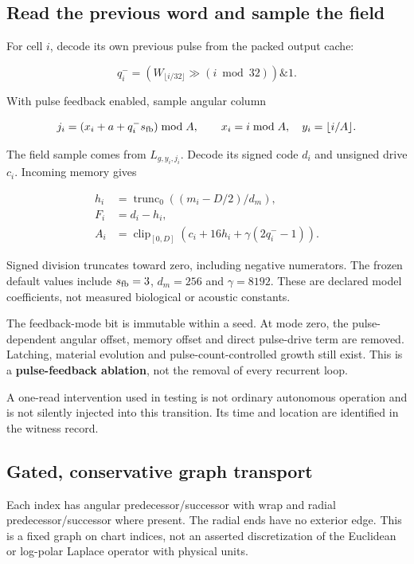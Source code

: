 \documentclass[11pt,a4paper]{article}
\begin{document}
\subsection{Read the previous word and sample the
field}\label{read-the-previous-word-and-sample-the-field}

For cell \(i\), decode its own previous pulse from the packed output
cache:

\[
q_i^-=
\left(W_{\lfloor i/32\rfloor}\gg(i\bmod32)\right)\mathbin{\&}1.
\]

With pulse feedback enabled, sample angular column

\[
j_i=(x_i+a+q_i^-s_{\rm fb})\bmod A,
\qquad x_i=i\bmod A,\quad y_i=\lfloor i/A\rfloor.
\]

The field sample comes from \(L_{g,y_i,j_i}\). Decode its signed code
\(d_i\) and unsigned drive \(c_i\). Incoming memory gives

\[
\begin{aligned}
h_i&=\operatorname{trunc}_0((m_i-D/2)/d_m),\\
F_i&=d_i-h_i,\\
A_i&=\operatorname{clip}_{[0,D]}
 \left(c_i+16h_i+\gamma(2q_i^--1)\right).
\end{aligned}
\]

Signed division truncates toward zero, including negative numerators.
The frozen default values include \(s_{\rm fb}=3\), \(d_m=256\) and
\(\gamma=8192\). These are declared model coefficients, not measured
biological or acoustic constants.

The feedback-mode bit is immutable within a seed. At mode zero, the
pulse-dependent angular offset, memory offset and direct pulse-drive
term are removed. Latching, material evolution and
pulse-count-controlled growth still exist. This is a
\textbf{pulse-feedback ablation}, not the removal of every recurrent
loop.

A one-read intervention used in testing is not ordinary autonomous
operation and is not silently injected into this transition. Its time
and location are identified in the witness record.

\subsection{Gated, conservative graph
transport}\label{gated-conservative-graph-transport}

Each index has angular predecessor/successor with wrap and radial
predecessor/successor where present. The radial ends have no exterior
edge. This is a fixed graph on chart indices, not an asserted
discretization of the Euclidean or log-polar Laplace operator with
physical units.
\end{document}
